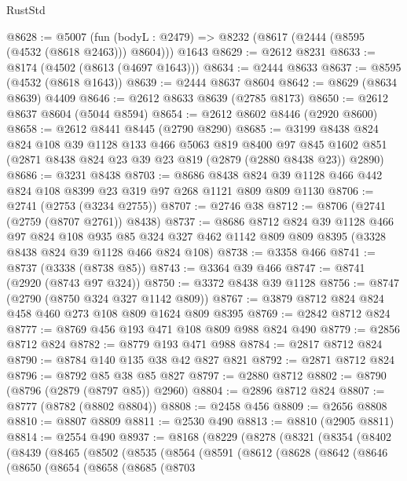 \begin{lexlean}{RustStd}
\begin{coremodule}
@8628 := @5007
    (fun (bodyL : @2479) => @8232 (@8617 (@2444 (@8595 (@4532 (@8618 @2463))) @8604)))
    @1643
@8629 := @2612 @8231
@8633 := @8174 (@4502 (@8613 (@4697 @1643)))
@8634 := @2444 @8633
@8637 := @8595 (@4532 (@8618 @1643))
@8639 := @2444 @8637 @8604
@8642 := @8629 (@8634 @8639) @4409
@8646 := @2612 @8633 @8639 (@2785 @8173)
@8650 := @2612 @8637 @8604 (@5044 @8594)
@8654 := @2612 @8602 @8446 (@2920 @8600)
@8658 := @2612 @8441 @8445 (@2790 @8290)
@8685 := @3199
    @8438
    @824
    @824
    @108
    @39
    @1128
    @133
    @466
    @5063
    @819
    @8400
    @97
    @845
    @1602
    @851
    (@2871 @8438 @824 @23 @39 @23 @819 (@2879 (@2880 @8438 @23)) @2890)
@8686 := @3231 @8438
@8703 := @8686
    @8438
    @824
    @39
    @1128
    @466
    @442
    @824
    @108
    @8399
    @23
    @319
    @97
    @268
    @1121
    @809
    @809
    @1130
@8706 := @2741 (@2753 (@3234 @2755))
@8707 := @2746 @38
@8712 := @8706 (@2741 (@2759 (@8707 @2761)) @8438)
@8737 := @8686
    @8712
    @824
    @39
    @1128
    @466
    @97
    @824
    @108
    @935
    @85
    @324
    @327
    @462
    @1142
    @809
    @809
    @8395
    (@3328 @8438 @824 @39 @1128 @466 @824 @108)
@8738 := @3358 @466
@8741 := @8737 (@3338 (@8738 @85))
@8743 := @3364 @39 @466
@8747 := @8741 (@2920 (@8743 @97 @324))
@8750 := @3372 @8438 @39 @1128
@8756 := @8747 (@2790 (@8750 @324 @327 @1142 @809))
@8767 := @3879 @8712 @824 @824 @458 @460 @273 @108 @809 @1624 @809 @8395
@8769 := @2842 @8712 @824
@8777 := @8769 @456 @193 @471 @108 @809 @988 @824 @490
@8779 := @2856 @8712 @824
@8782 := @8779 @193 @471 @988
@8784 := @2817 @8712 @824
@8790 := @8784 @140 @135 @38 @42 @827 @821
@8792 := @2871 @8712 @824
@8796 := @8792 @85 @38 @85 @827
@8797 := @2880 @8712
@8802 := @8790 (@8796 (@2879 (@8797 @85)) @2960)
@8804 := @2896 @8712 @824
@8807 := @8777 (@8782 (@8802 @8804))
@8808 := @2458 @456
@8809 := @2656 @8808
@8810 := @8807 @8809
@8811 := @2530 @490
@8813 := @8810 (@2905 @8811)
@8814 := @2554 @490
@8937 := @8168
    (@8229
      (@8278
        (@8321
          (@8354
            (@8402
              (@8439
                (@8465
                  (@8502
                    (@8535
                      (@8564
                        (@8591
                          (@8612
                            (@8628
                              (@8642
                                (@8646
                                  (@8650
                                    (@8654
                                      (@8658
                                        (@8685
                                          (@8703

\end{coremodule}
\end{lexlean}
